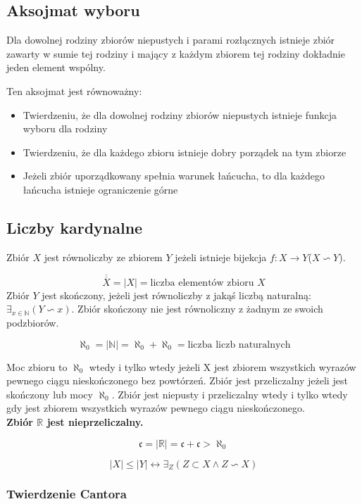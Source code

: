 \documentclass{../notatki}
\begin{document}
\subsection{Aksojmat wyboru}

Dla dowolnej rodziny zbiorów niepustych i parami rozłącznych istnieje zbiór
zawarty w sumie tej rodziny i mający z każdym zbiorem tej rodziny dokładnie
jeden element wspólny.

Ten aksojmat jest równoważny:
\begin{itemize}
  \item Twierdzeniu, że dla dowolnej rodziny zbiorów niepustych
    istnieje funkcja wyboru dla rodziny
  \item Twierdzeniu, że dla każdego zbioru istnieje dobry porządek na
    tym zbiorze
  \item Jeżeli zbiór uporządkowany spełnia warunek łańcucha, to dla
    każdego łańcucha istnieje ograniczenie górne
\end{itemize}

\subsection{Liczby kardynalne}

Zbiór $X$ jest równoliczby ze zbiorem $Y$ jeżeli istnieje bijekcja
$f: X \rightarrow Y$($X \backsim Y$).

$$
\overline{\overline{X}} = |X| = \text{liczba elementów zbioru } X
$$
Zbiór $Y$ jest skończony, jeżeli jest równoliczby z jakąś liczbą naturalną:
$\exists_{x \in \mathbb{N}}(Y \backsim x)$. Zbiór skończony nie jest równoliczny
z żadnym ze swoich podzbiorów.

$$
\aleph_0 = |\mathbb{N}| = \aleph_0 + \aleph_0 = \text{liczba liczb naturalnych}
$$

Moc zbioru to $\aleph_0$ wtedy i tylko wtedy jeżeli X jest zbiorem wszystkich
wyrazów pewnego ciągu nieskończonego bez powtórzeń. Zbiór jest przeliczalny
jeżeli jest skończony lub mocy $\aleph_0$. Zbiór jest niepusty i przeliczalny
wtedy i tylko wtedy gdy jest zbiorem wszystkich wyrazów pewnego ciągu
nieskończonego.\\
\textbf{Zbiór $\mathbb{R}$ jest nieprzeliczalny.}

$$
\mathfrak{c} = |\mathbb{R}| = \mathfrak{c} + \mathfrak{c} > \aleph_0
$$

$$
|X| \le |Y| \leftrightarrow \exists_Z(Z \subset X \land Z \backsim X)
$$

\subsubsection{Twierdzenie Cantora}
\end{document}
